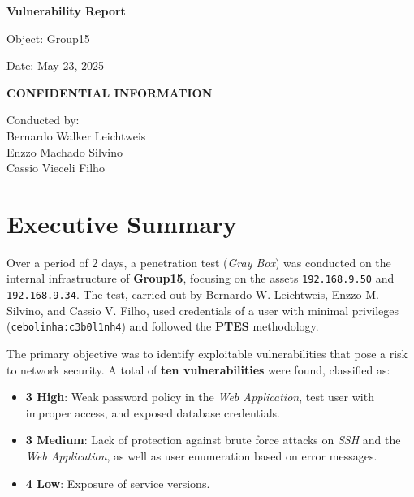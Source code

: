 \documentclass[a4paper,12pt]{article}
\begin{document}
\pagestyle{fancy}


\begin{titlepage}
    \centering
    \vspace*{2cm}
    {\Huge\bfseries Vulnerability Report\par}
    \vspace{1cm}
    {\Large Object: Group15\par}
    {\Large Date: May 23, 2025\par}
    \vspace{0.5cm}
    {\large\bfseries CONFIDENTIAL INFORMATION\par}
    \vspace{2cm}
    {\large Conducted by: \\ Bernardo Walker Leichtweis \\ Enzzo Machado Silvino \\ Cassio Vieceli Filho\par}
\end{titlepage}

\tableofcontents
\clearpage

\section{Executive Summary}
Over a period of 2 days, a penetration test (\textit{Gray Box}) was conducted on the internal infrastructure of \textbf{Group15}, focusing on the assets \texttt{192.168.9.50} and \texttt{192.168.9.34}. The test, carried out by Bernardo W. Leichtweis, Enzzo M. Silvino, and Cassio V. Filho, used credentials of a user with minimal privileges (\texttt{cebolinha:c3b0l1nh4}) and followed the \textbf{PTES} methodology.

The primary objective was to identify exploitable vulnerabilities that pose a risk to network security. A total of \textbf{ten vulnerabilities} were found, classified as:
\begin{itemize}
    \item \textbf{3 High}: Weak password policy in the \textit{Web Application}, test user with improper access, and exposed database credentials.
    \item \textbf{3 Medium}: Lack of protection against brute force attacks on \textit{SSH} and the \textit{Web Application}, as well as user enumeration based on error messages.
    \item \textbf{4 Low}: Exposure of service versions.
\end{itemize}
\end{document}
